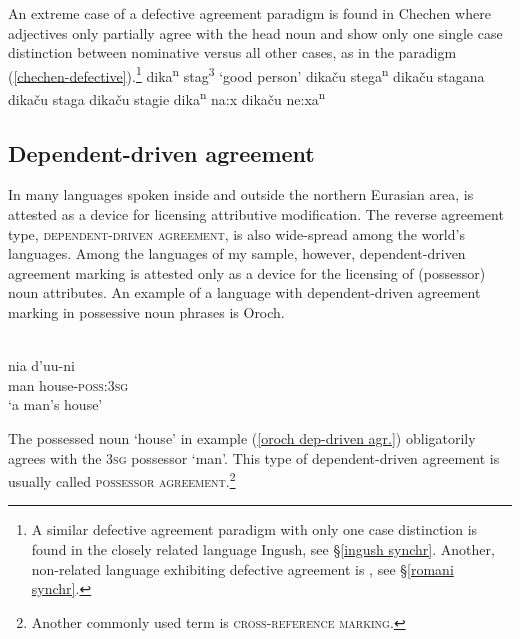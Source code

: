 An extreme case of a defective agreement paradigm is found in Chechen where adjectives only partially agree with the head noun and show only one single case distinction between nominative versus all other cases, as in the paradigm (\ref{chechen-defective}).\footnote{A similar defective agreement paradigm with only one case distinction is found in the closely related language Ingush, see \S\ref{ingush synchr}. Another, non-related language exhibiting defective agreement is , see \S\ref{romani synchr}.}
\ea
\label{chechen-defective}
\ea dika\textsuperscript{n} stag\textsuperscript{3} {\rm ‘good person’}		
\ex dikaču stega\textsuperscript{n} 								
\ex dikaču stagana 											
\ex dikaču staga 											
\ex dikaču stagie											
\ex dika\textsuperscript{n} na:x									
\ex dikaču ne:xa\textsuperscript{n}								
\zl
{}

\subsection{Dependent\hyp{}driven agreement}
In many languages spoken inside and outside the northern Eurasian area,  is attested as a device for licensing attributive modification. The reverse agreement type, \textsc{dependent\hyp{}driven agreement}, is also wide-spread among the world's languages. Among the languages of my sample, however, dependent\hyp{}driven agreement marking is attested only as a device for the licensing of (possessor) noun attributes. An example of a language with dependent\hyp{}driven agreement marking in possessive noun phrases is Oroch.
\begin{exe}
\ex
\label{oroch dep-driven agr.}
\\
\gll 	nia	d'uu-ni\\
	man	house-\textsc{poss:3sg}\\
\glt	‘a man's house’
\end{exe}
The possessed noun ‘house’ in example (\ref{oroch dep-driven agr.}) obligatorily agrees with the \textsc{3sg} possessor ‘man’. This type of dependent\hyp{}driven agreement is usually called \textsc{possessor agreement}.\footnote{Another commonly used term is \textsc{cross-reference marking}.}

